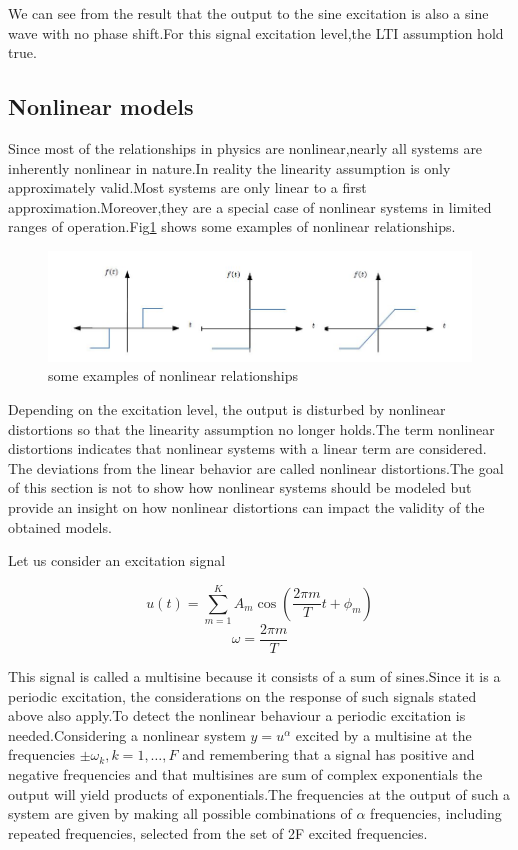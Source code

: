 \documentclass[a4paper,12pt]{article}
\numberwithin{equation}{section}
\begin{document}
We can see from the result that the output to the sine excitation is also a sine wave with no phase shift.For this signal excitation level,the LTI assumption hold true.

\subsection{Nonlinear models}
Since most of the relationships in physics are nonlinear,nearly all systems are inherently nonlinear in nature.In reality the linearity assumption is only approximately valid.Most systems are only linear to a first approximation.Moreover,they are a special case of nonlinear systems in limited ranges of operation.Fig\ref{fig:examplenonlinear} shows some examples of nonlinear relationships.


\begin{figure}[H]
    \includegraphics[scale=1]{examplenonlinear.JPG}
    \centering
    \caption{some examples of nonlinear relationships}
    \label{fig:examplenonlinear}
\end{figure}



Depending on the excitation level, the output is disturbed by nonlinear distortions so that the linearity assumption no longer holds.The term nonlinear distortions indicates that nonlinear systems with a linear term are considered. The deviations from the linear behavior are called nonlinear distortions.The goal of this section is not to show how nonlinear systems should be modeled but provide an insight on how nonlinear distortions can impact the validity of the obtained models.

Let us consider an excitation signal

\[u(t)=\sum_{m=1}^{K} A_{m} \cos \left(\frac{2 \pi m}{T} t+\phi_{m}\right)\]
\[\omega=\frac{2 \pi m}{T}\]

This signal is called a multisine because it consists of a sum of sines.Since it is a periodic excitation, the considerations on the response of such signals stated above also apply.To detect the nonlinear behaviour a periodic excitation is needed.Considering a nonlinear system $y=u^{\alpha}$ excited by a multisine at the frequencies $\pm \omega_{k}, k=1, \ldots, F$ and remembering that a signal has  positive and negative frequencies and that multisines are sum of complex exponentials the output will yield products of exponentials.The frequencies at the output of such a system are given by making all possible combinations of $\alpha$ frequencies, including repeated frequencies, selected from the set of 2F excited frequencies.
\end{document}
